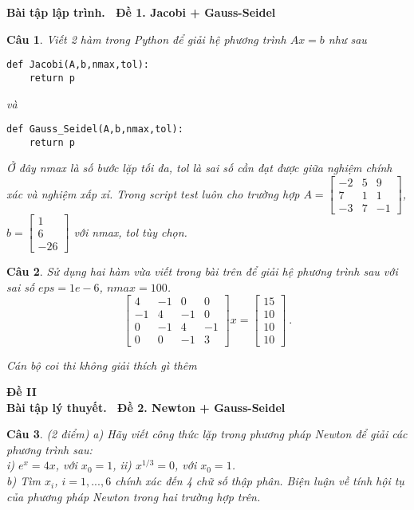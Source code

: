 \documentclass[11pt]{article}
\newtheorem{bt}{Câu}
\newcommand{\m}[1]{
	\begin{bmatrix}
		#1
	\end{bmatrix}
}
\begin{document}
\cleardoublepage

\begin{center}
\textbf{ Bài tập lập trình.  \ Đề 1. Jacobi + Gauss-Seidel}
\end{center}

\begin{bt}
	Viết 2 hàm trong Python để giải hệ phương trình $Ax=b$ như sau
	\begin{lstlisting}[frame=single] 
	def Jacobi(A,b,nmax,tol):
	return p
	\end{lstlisting}
	và
	\begin{lstlisting}[frame=single] 
	def Gauss_Seidel(A,b,nmax,tol):
	return p
	\end{lstlisting}
	Ở đây nmax là số bước lặp tối đa, tol là sai số cần đạt được giữa nghiệm chính xác và nghiệm xấp xỉ.
	Trong script test luôn cho trường hợp $A =\m{-2 & 5 & 9 \\ 7 & 1 & 1 \\ -3 & 7 & -1}$, $b=\m{1 \\ 6 \\ -26}$ với nmax, tol tùy chọn.
\end{bt}

\begin{bt} %
Sử dụng hai hàm vừa viết trong bài trên để giải hệ phương trình sau với sai số $eps=1e-6$, $nmax=100$.
\begin{equation*}
\m{4 & -1 & 0 & 0 \\ -1 & 4 & -1 & 0 \\ 0 & -1 & 4 & -1 \\ 0 & 0 & -1 & 3} x = \m{15 \\ 10 \\ 10 \\ 10} \ .
\end{equation*}
\end{bt}

\vspace{1cm}
 {\it Cán bộ coi thi không giải thích gì thêm}\\


\cleardoublepage 

\begin{center}	
	\textbf{ Đề II} \\
	\textbf{  Bài tập lý thuyết.  \ Đề 2. Newton + Gauss-Seidel }
\end{center}

\begin{bt}(2 điểm) %
a) Hãy viết công thức lặp trong phương pháp Newton để giải các phương trình sau: \\
\indent i)  $e^x = 4 x $, với $x_0 = 1$, \hskip 4cm \quad 	ii) $x^{1/3} = 0$, với $x_0 = 1$. \\ 
b) Tìm $x_i$, $i=1,...,6$ chính xác đến 4 chữ số thập phân. Biện luận về tính hội tụ của phương pháp Newton trong hai trường hợp trên.
\end{bt}
\end{document}

